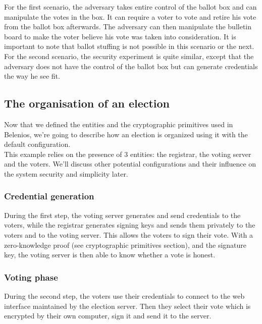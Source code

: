 \documentclass[12pt, a4paper]{report}
\begin{document}
For the first scenario, the adversary takes entire control of the ballot box and can manipulate the votes in the box. It can require a voter to vote and retire his vote from the ballot box afterwards. The adversary can then manipulate the bulletin board to make the voter believe his vote was taken into consideration. It is important to note that ballot stuffing is not possible in this scenario or the next.\\

For the second scenario, the security experiment is quite similar, except that the adversary does not have the control of the ballot box but can generate credentials the way he see fit. 

\subsection{The organisation of an election}

Now that we defined the entities and the cryptographic primitives used in Belenios, we're going to describe how an election is organized using it with the default configuration.\\

This example relies on the presence of 3 entities: the registrar, the voting server and the voters. We'll discuss other potential configurations and their influence on the system security and simplicity later.

\subsubsection{Credential generation}

During the first step, the voting server generates and send credentials to the voters, while the registrar generates signing keys and sends them privately to the voters and to the voting server. This allows the voters to sign their vote. With a zero-knowledge proof (see cryptographic primitives section), and the signature key, the voting server is then able to know whether a  vote is honest.  

\subsubsection{Voting phase}

During the second step, the voters use their credentials to connect to the web interface maintained by the election server. Then they select their vote which is encrypted by their own computer, sign it and send it to the server. 
\end{document}
